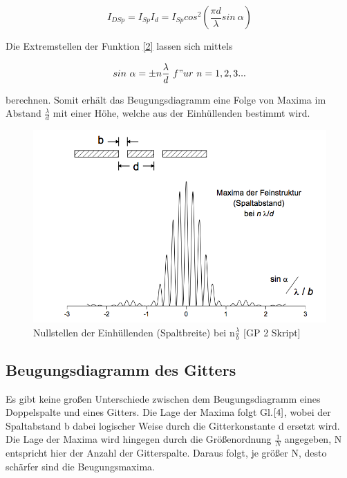 \documentclass{article}
\begin{document}
\begin{equation}
\label{3}
I_{DSp} = I_{Sp}I_d = I_{Sp} cos^2(\frac{\pi d}{\lambda} sin\ \alpha)
\end{equation}

Die Extremstellen der Funktion \eqref{2} lassen sich mittels

\begin{equation}
\label{4}
sin\ \alpha = \pm n\frac{\lambda}{d}\  f"ur\ n = 1,2,3...
\end{equation}

berechnen.
Somit erhält das Beugungsdiagramm eine Folge von Maxima im Abstand $\frac{\lambda}{d}$ mit einer Höhe, welche aus der Einhüllenden bestimmt wird.

\begin{figure}[htbp]
\centering
\includegraphics[scale=0.3]{BEU2.png}
\begin{center}
\caption{Nullstellen der Einhüllenden (Spaltbreite) bei n$\frac{\lambda}{b}$ [GP 2 Skript]}
\end{center}
\end{figure}

\subsection{Beugungsdiagramm des Gitters}
Es gibt keine großen Unterschiede zwischen dem Beugungsdiagramm eines Doppelspalte und eines Gitters. Die Lage der Maxima folgt Gl.\(\eqref{4}\), wobei der Spaltabstand b dabei logischer Weise durch die Gitterkonstante d ersetzt wird. Die Lage der Maxima wird hingegen durch die Größenordnung \(\frac{1}{N}\) angegeben, N entspricht hier der Anzahl der Gitterspalte. Daraus folgt, je größer N, desto schärfer sind die Beugungsmaxima.
\end{document}
